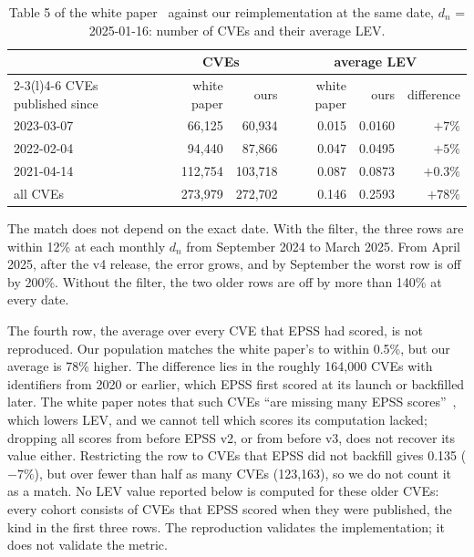 \begin{table}[t]
\centering\small
\caption{Table 5 of the white paper~\cite{mell2025lev} against our
reimplementation at the same date, $d_n$ = 2025-01-16: number of CVEs and
their average LEV.}\label{tab:repro}
\begin{tabular}{@{}lrrrrr@{}}
\toprule
 & \multicolumn{2}{c}{CVEs} & \multicolumn{3}{c}{average LEV} \\
\cmidrule(lr){2-3}\cmidrule(l){4-6}
CVEs published since & white paper & ours & white paper & ours & difference \\
\midrule
2023-03-07 & 66,125 & 60,934 & 0.015 & 0.0160 & $+7\%$ \\
2022-02-04 & 94,440 & 87,866 & 0.047 & 0.0495 & $+5\%$ \\
2021-04-14 & 112,754 & 103,718 & 0.087 & 0.0873 & $+0.3\%$ \\
all CVEs & 273,979 & 272,702 & 0.146 & 0.2593 & $+78\%$ \\
\bottomrule
\end{tabular}
\end{table}

The match does not depend on the exact date. With the filter, the three rows
are within 12\% at each monthly $d_n$ from September 2024 to March 2025. From
April 2025, after the v4 release, the error grows, and by September the worst
row is off by 200\%. Without the filter, the two older rows are off by more
than 140\% at every date.

The fourth row, the average over every CVE that EPSS had scored, is not
reproduced. Our population matches the white paper's to within 0.5\%, but our
average is 78\% higher. The difference lies in the roughly 164,000 CVEs with
identifiers from 2020 or earlier, which EPSS first scored at its launch or
backfilled later. The white paper notes that such CVEs ``are missing many EPSS
scores''~\cite[Sec.~7.2]{mell2025lev}, which lowers LEV, and we cannot tell
which scores its computation lacked; dropping all scores from before EPSS v2,
or from before v3, does not recover its value either. Restricting the row to
CVEs that EPSS did not backfill gives 0.135 ($-7\%$), but over fewer than half
as many CVEs (123,163), so we do not count it as a match. No LEV value
reported below is computed for these older CVEs: every cohort consists of CVEs
that EPSS scored when they were published, the kind in the first three rows. The
reproduction validates the implementation; it does not validate the metric.


